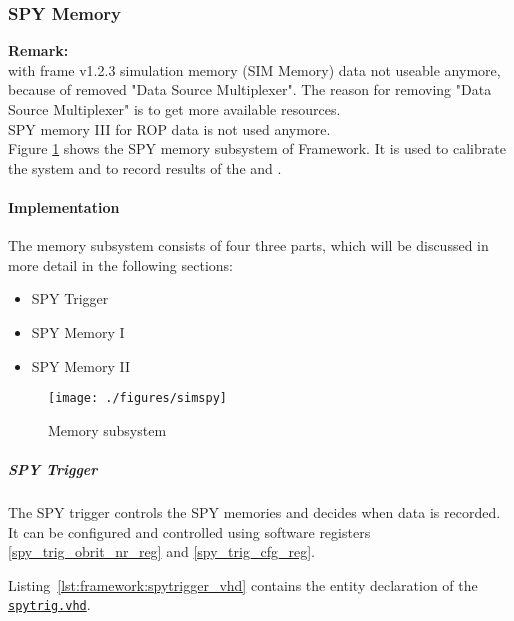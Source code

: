 \clearpage

%
%

\subsubsection{SPY Memory}\label{sec:framework:spy}
\textbf{Remark:}\\
with frame v1.2.3 simulation memory (SIM Memory) data not useable anymore, because of removed "Data Source Multiplexer".
The reason for removing "Data Source Multiplexer" is to get more available resources.\\
SPY memory III for ROP data is not used anymore.\\

Figure \ref{fig_simspy} shows the SPY memory subsystem of Framework.
It is used to calibrate the system and to record results of the \ugtl and \ufdl.

\paragraph{Implementation}\label{sec:framework:spy_impl}
The memory subsystem consists of four three parts, which will be discussed in more detail in the following sections:

\begin{itemize}
\item SPY Trigger
\item SPY Memory I
\item SPY Memory II
\end{itemize}

\begin{figure}[h]
\texttt{[image: ./figures/simspy]}
\caption{Memory subsystem}
\label{fig_simspy}
\end{figure}

\subparagraph{SPY Trigger}\label{sec:framework:spy_trigger}
The SPY trigger controls the SPY memories and decides when data is recorded. It can be configured and controlled using software registers \ref{spy_trig_obrit_nr_reg} and \ref{spy_trig_cfg_reg}.

Listing~\ref{lst:framework:spytrigger_vhd} contains the entity declaration of the \href{\gitbranch/firmware/hdl/payload/frame/spytrig.vhd}{\texttt{\textquotesingle spytrig.vhd\textquotesingle }}.\\

